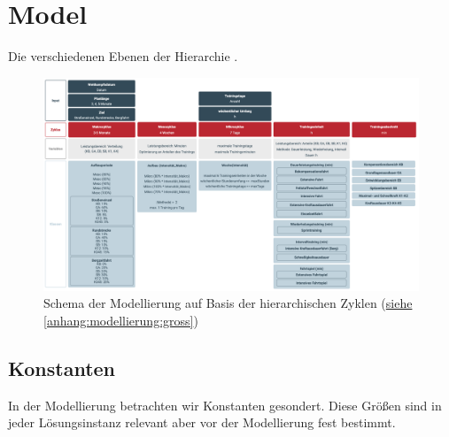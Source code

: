 \section{Model}
\label{sec:modellierung:model}
Die verschiedenen Ebenen der Hierarchie . 
\begin{figure}[h]
    \includegraphics[width=\textwidth,height=\textheight, keepaspectratio]{gfx/modellierung.png}
    \caption{Schema der Modellierung auf Basis der hierarchischen Zyklen (\hyperref[anhang:modellierung:gross]{siehe \ref{anhang:modellierung:gross}})}
    \label{sec:modellierung:schema}
\end{figure}


\subsection{Konstanten}
In der Modellierung betrachten wir Konstanten gesondert. Diese Größen sind in jeder Lösungsinstanz relevant aber vor der Modellierung fest bestimmt.

